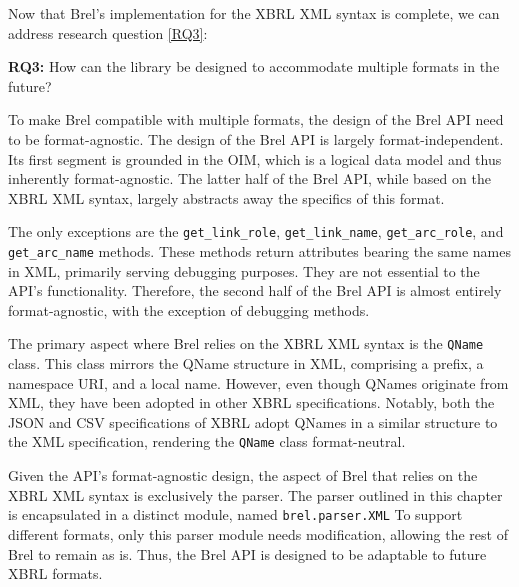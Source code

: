 Now that Brel's implementation for the XBRL XML syntax is complete, we can address research question \ref{RQ3}:

\begin{displayquote}
    \textbf{RQ3:} How can the library be designed to accommodate multiple formats in the future?
\end{displayquote}

To make Brel compatible with multiple formats, the design of the Brel API need to be format-agnostic. 
The design of the Brel API is largely format-independent. 
Its first segment is grounded in the OIM, which is a logical data model and thus inherently format-agnostic.
The latter half of the Brel API, while based on the XBRL XML syntax, largely abstracts away the specifics of this format. 

The only exceptions are the \texttt{get\_link\_role}, \texttt{get\_link\_name}, \texttt{get\_arc\_role}, and \texttt{get\_arc\_name} methods.
These methods return attributes bearing the same names in XML, primarily serving debugging purposes.
They are not essential to the API's functionality.
Therefore, the second half of the Brel API is almost entirely format-agnostic, with the exception of debugging methods.

The primary aspect where Brel relies on the XBRL XML syntax is the \texttt{QName} class.
This class mirrors the QName structure in XML, comprising a prefix, a namespace URI, and a local name. 
However, even though QNames originate from XML, they have been adopted in other XBRL specifications.
Notably, both the JSON\cite{xbrl_json} and CSV\cite{xbrl_csv} specifications of XBRL adopt QNames in a similar structure to the XML specification, 
rendering the \texttt{QName} class format-neutral.

Given the API's format-agnostic design, the aspect of Brel that relies on the XBRL XML syntax is exclusively the parser. 
The parser outlined in this chapter is encapsulated in a distinct module, named \texttt{brel.parser.XML}
To support different formats, only this parser module needs modification, allowing the rest of Brel to remain as is.
Thus, the Brel API is designed to be adaptable to future XBRL formats.

